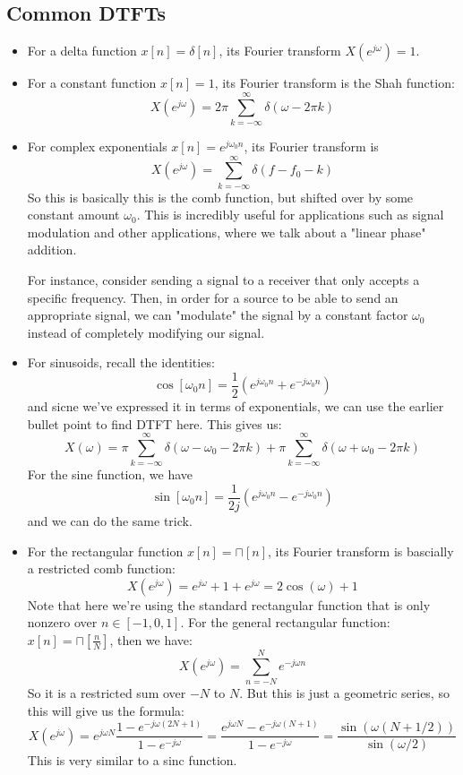 \subsection{Common DTFTs}
\begin{itemize}
	\item For a delta function \( x[n] = \delta[n] \), its Fourier transform \( X(e^{j \omega}) = 1 \). 
	\item For a constant function \( x[n] = 1 \), its Fourier transform is the Shah function: 
		\[
		X(e^{j \omega}) = 2\pi \sum_{k=-\infty}^{\infty} \delta(\omega - 2 \pi k) 
		\] 
	\item For complex exponentials \( x[n] = e^{j \omega_0 n} \), its Fourier transform is
		\[
		X(e^{j \omega}) = \sum_{k=-\infty}^{\infty} \delta(f - f_0 - k)
		\] 
		So this is basically this is the comb function, but shifted over by some constant 
		amount \( \omega_0 \). This is incredibly useful for applications such as signal modulation and other 
		applications, where we talk about a "linear phase" addition.  

		For instance, consider sending a signal to a receiver that only accepts a specific frequency. Then, in order 
		for a source to be able to send an appropriate signal, we can "modulate" the signal by a constant 
		factor \( \omega_0 \) instead of completely modifying our signal. 
	\item For sinusoids, recall the identities: 
		\[
			\cos[\omega_0 n]= \frac{1}{2}(e^{ j \omega_0 n} + e^{- j \omega_0 n})
		\] 
		and sicne we've expressed it in terms of exponentials, we can use the earlier bullet point to find DTFT 
		here. This gives us: 
		\[
		X(\omega) = \pi \sum_{k = -\infty}^{\infty}\delta(\omega - \omega_0 - 2 \pi k) 
		+ \pi \sum_{k= -\infty}^{\infty} \delta(\omega + \omega_0 - 2 \pi k)
		\] 
		For the sine function, we have
		\[
			\sin[\omega_0 n] = \frac{1}{2j}(e^{j \omega_0 n } - e^{- j \omega_0 n})
		\] 
		and we can do the same trick.
	\item For the rectangular function \( x[n] = \sqcap[n] \), its Fourier transform is bascially a restricted 
		comb function: 
		\[
		X(e^{j \omega}) = e^{ j \omega} + 1 + e^{j \omega} = 2 \cos(\omega) + 1
		\] 
		Note that here we're using the standard rectangular function that is only nonzero over \( n \in [-1, 0, 1] \).
		For the general rectangular function: \( x[n] = \sqcap\left[ \frac{n}{N} \right]  \), then 
		we have:
		\[
		X(e^{j \omega}) = \sum_{n=-N}^{N} e^{-j \omega n}
		\] 
		So it is a restricted sum over \( -N \) to \( N \). But this is just a geometric series, so this will give 
		us the formula:
		\[
		X(e^{j \omega}) = e^{j \omega N}\frac{1 - e^{-j \omega (2N + 1)}}{1 - e^{-j \omega}} = 
		\frac{e^{j \omega N} - e^{-j \omega (N + 1)}}{1 - e^{-j \omega}} =
		\frac{\sin(\omega(N + 1 /2))}{\sin(\omega / 2)}
		\] 
		This is very similar to a sinc function. 
\end{itemize}
